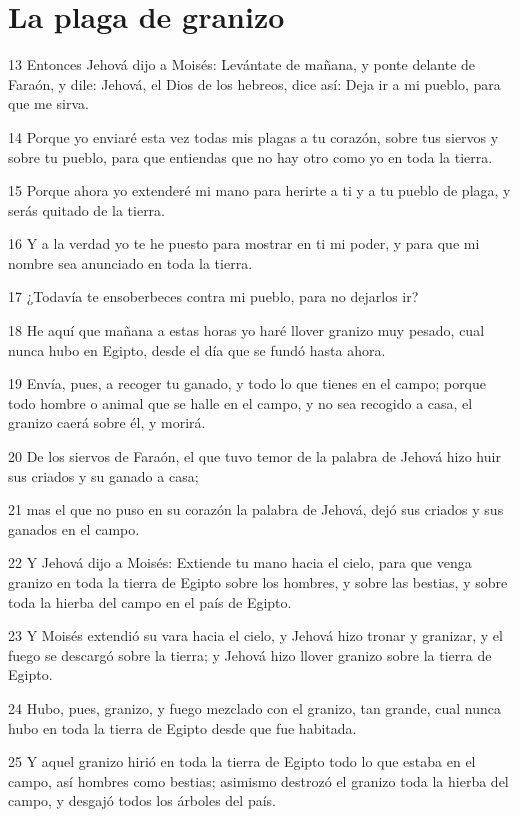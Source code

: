 \section*{La plaga de granizo}

\par 13 Entonces Jehová dijo a Moisés: Levántate de mañana, y ponte delante de Faraón, y dile: Jehová, el Dios de los hebreos, dice así: Deja ir a mi pueblo, para que me sirva.
\par 14 Porque yo enviaré esta vez todas mis plagas a tu corazón, sobre tus siervos y sobre tu pueblo, para que entiendas que no hay otro como yo en toda la tierra.
\par 15 Porque ahora yo extenderé mi mano para herirte a ti y a tu pueblo de plaga, y serás quitado de la tierra.
\par 16 Y a la verdad yo te he puesto para mostrar en ti mi poder, y para que mi nombre sea anunciado en toda la tierra.
\par 17 ¿Todavía te ensoberbeces contra mi pueblo, para no dejarlos ir?
\par 18 He aquí que mañana a estas horas yo haré llover granizo muy pesado, cual nunca hubo en Egipto, desde el día que se fundó hasta ahora.
\par 19 Envía, pues, a recoger tu ganado, y todo lo que tienes en el campo; porque todo hombre o animal que se halle en el campo, y no sea recogido a casa, el granizo caerá sobre él, y morirá.
\par 20 De los siervos de Faraón, el que tuvo temor de la palabra de Jehová hizo huir sus criados y su ganado a casa;
\par 21 mas el que no puso en su corazón la palabra de Jehová, dejó sus criados y sus ganados en el campo.
\par 22 Y Jehová dijo a Moisés: Extiende tu mano hacia el cielo, para que venga granizo en toda la tierra de Egipto sobre los hombres, y sobre las bestias, y sobre toda la hierba del campo en el país de Egipto.
\par 23 Y Moisés extendió su vara hacia el cielo, y Jehová hizo tronar y granizar, y el fuego se descargó sobre la tierra; y Jehová hizo llover granizo sobre la tierra de Egipto.
\par 24 Hubo, pues, granizo, y fuego mezclado con el granizo, tan grande, cual nunca hubo en toda la tierra de Egipto desde que fue habitada.
\par 25 Y aquel granizo hirió en toda la tierra de Egipto todo lo que estaba en el campo, así hombres como bestias; asimismo destrozó el granizo toda la hierba del campo, y desgajó todos los árboles del país.
